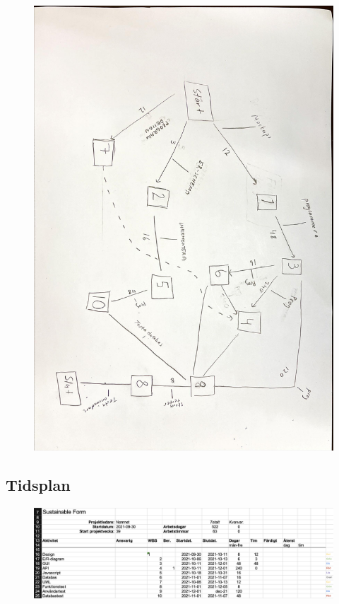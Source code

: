 \documentclass{article}
\begin{document}
\\
\begin{figure}[htp]
    \centering
    \includegraphics[width = \textwidth, angle=90]{Pert.jpg}
    \label{fig:24}
\end{figure}

\newpage
\subsection{Tidsplan}

\begin{figure}[htp]
    \centering
    \includegraphics[width = 450px]{gantt1.png}
    \label{fig:24}
\end{figure}
\end{document}
